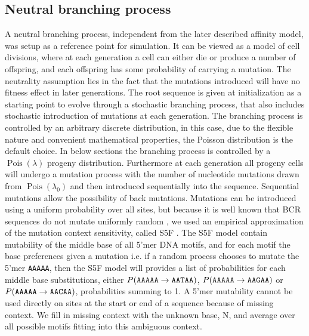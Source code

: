 \subsection{Neutral branching process}
A neutral branching process, independent from the later described affinity model, was setup as a reference point for simulation.
It can be viewed as a model of cell divisions, where at each generation a cell can either die or produce a number of offspring, and each offspring has some probability of carrying a mutation.
The neutrality assumption lies in the fact that the mutations introduced will have no fitness effect in later generations.
The root sequence is given at initialization as a starting point to evolve through a stochastic branching process, that also includes stochastic introduction of mutations at each generation.
The branching process is controlled by an arbitrary discrete distribution, in this case, due to the flexible nature and convenient mathematical properties, the Poisson distribution is the default choice.
In below sections the branching process is controlled by a $\operatorname{Pois}(\lambda)$ progeny distribution.
Furthermore at each generation all progeny cells will undergo a mutation process with the number of nucleotide mutations drawn from $\operatorname{Pois}(\lambda_0)$ and then introduced sequentially into the sequence.
Sequential mutations allow the possibility of back mutations.
Mutations can be introduced using a uniform probability over all sites, but because it is well known that BCR sequences do not mutate uniformly random \cite{Yeap2015-nl}, we used an empirical approximation of the mutation context sensitivity, called S5F \cite{cui2016model}.
The S5F model contain mutability of the middle base of all 5'mer DNA motifs, and for each motif the base preferences given a mutation i.e. if a random process chooses to mutate the 5'mer \texttt{AAAAA}, then the S5F model will provides a list of probabilities for each middle base substitutions, either $P(\text{\texttt{AAAAA}} \rightarrow \text{\texttt{AATAA}})$, $P(\text{\texttt{AAAAA}} \rightarrow \text{\texttt{AAGAA}})$ or $P(\text{\texttt{AAAAA}} \rightarrow \text{\texttt{AACAA}})$, probabilities summing to 1.
A 5'mer mutability cannot be used directly on sites at the start or end of a sequence because of missing context.
We fill in missing context with the unknown base, N, and average over all possible motifs fitting into this ambiguous context.

